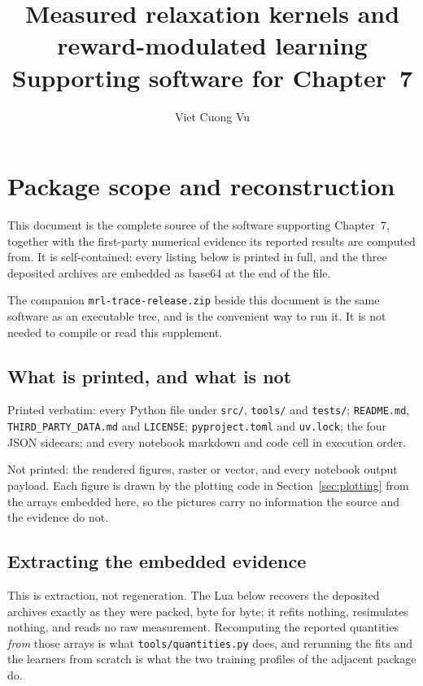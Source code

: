 \documentclass[a4paper,10pt]{article}
\title{Measured relaxation kernels and reward-modulated learning\\
       \large Supporting software for Chapter~7}
\author{Viet Cuong Vu}
\date{}
\begin{document}
\maketitle
\section{Package scope and reconstruction}
This document is the complete source of the software supporting Chapter~7, together with the
first-party numerical evidence its reported results are computed from. It is self-contained:
every listing below is printed in full, and the three deposited archives are embedded as
base64 at the end of the file.

The companion \texttt{mrl-trace-release.zip} beside this document is the same software as an
executable tree, and is the convenient way to run it. It is not needed to compile or read
this supplement.

\subsection{What is printed, and what is not}
Printed verbatim: every Python file under \texttt{src/}, \texttt{tools/} and \texttt{tests/};
\texttt{README.md}, \texttt{THIRD\_PARTY\_DATA.md} and \texttt{LICENSE};
\texttt{pyproject.toml} and \texttt{uv.lock}; the four JSON sidecars; and every notebook
markdown and code cell in execution order.

Not printed: the rendered figures, raster or vector, and every notebook output payload. Each
figure is drawn by the plotting code in Section~\ref{sec:plotting} from the arrays embedded
here, so the pictures carry no information the source and the evidence do not.

\subsection{Extracting the embedded evidence}
This is extraction, not regeneration. The Lua below recovers the deposited archives exactly as
they were packed, byte for byte; it refits nothing, resimulates nothing, and reads no raw
measurement. Recomputing the reported quantities \emph{from} those arrays is what
\texttt{tools/quantities.py} does, and rerunning the fits and the learners from scratch is what
the two training profiles of the adjacent package do.
\end{document}

